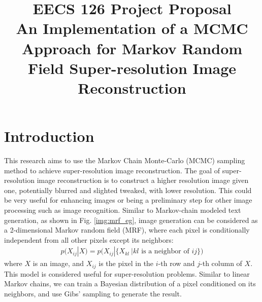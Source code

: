 \documentclass[conference]{IEEEtran}
\begin{document}
\title{
    EECS 126 Project Proposal \\
    {\footnotesize An Implementation of a MCMC Approach for Markov Random Field Super-resolution Image Reconstruction}
}

\author{
    \and
    \and
    \and
}

\maketitle

%

\section{Introduction}
This research aims to use the Markov Chain Monte-Carlo (MCMC) sampling method to achieve super-resolution image reconstruction. The goal of super-resolution image reconstruction is to construct a higher resolution image given one, potentially blurred and slighted tweaked, with lower resolution. This could be very useful for enhancing images or being a preliminary step for other image processing such as image recognition. Similar to Markov-chain modeled text generation, as shown in Fig. \ref{img:mrf_eg}, image generation can be considered as a 2-dimensional Markov random field (MRF), where each pixel is conditionally independent from all other pixels except its neighbors: 
\begin{align}
    p(X_{ij}|X) = p\big(X_{ij}|\{X_{kl}~| kl \text{ is a neighbor of } ij\}\big)
    \label{eq:pixel_dist}
\end{align}
where $X$ is an image, and $X_{ij}$ is the pixel in the $i$-th row and $j$-th column of $X$. This model is considered useful for super-resolution problems. \cite{tian2012bayesian} Similar to linear Markov chains, we can train a Bayesian distribution of a pixel conditioned on its neighbors, and use Gibs' sampling to generate the result. \cite{tian2005mcmc}
\end{document}
